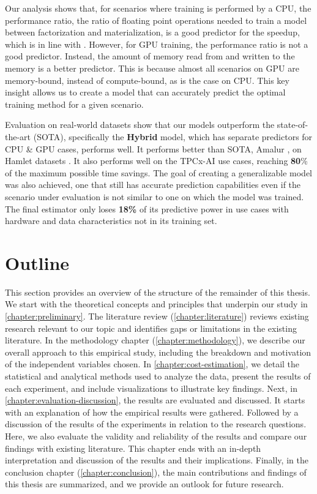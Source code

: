 Our analysis shows that, for scenarios where training is performed by a CPU, the performance ratio, the ratio of floating point operations needed to train a model between factorization and materialization, is a good predictor for the speedup, which is in line with \cite{amalur}. However, for GPU training, the performance ratio is not a good predictor. Instead, the amount of memory read from and written to the memory is a better predictor. This is because almost all scenarios on GPU are memory-bound, instead of compute-bound, as is the case on CPU. This key insight allows us to create a model that can accurately predict the optimal training method for a given scenario.

Evaluation on real-world datasets show that our models outperform the state-of-the-art (SOTA), specifically the \textbf{Hybrid} model, which has separate predictors for CPU \& GPU cases, performs well. It performs better than SOTA, Amalur \cite{schijndel_cost_estimation}, on Hamlet datasets \cite{2016-hamlet-sigmod}. It also performs well on the TPCx-AI use cases, reaching \textbf{80}\% of the maximum possible time savings. The goal of creating a generalizable model was also achieved, one that still has accurate prediction capabilities even if the scenario under evaluation is not similar to one on which the model was trained. The final estimator only loses \textbf{18\%} of its predictive power in use cases with hardware and data characteristics not in its training set.

\section{Outline}
This section provides an overview of the structure of the remainder of this thesis. We start with the theoretical concepts and principles that underpin our study in \autoref{chapter:preliminary}. The literature review (\autoref{chapter:literature}) reviews existing research relevant to our topic and identifies gaps or limitations in the existing literature. In the methodology chapter (\autoref{chapter:methodology}), we describe our overall approach to this empirical study, including the breakdown and motivation of the independent variables chosen.  In \autoref{chapter:cost-estimation}, we detail the statistical and analytical methods used to analyze the data, present the results of each experiment, and include visualizations to illustrate key findings. Next, in \autoref{chapter:evaluation-discussion}, the results are evaluated and discussed. It starts with an explanation of how the empirical results were gathered. Followed by a discussion of the results of the experiments in relation to the research questions. Here, we also evaluate the validity and reliability of the results and compare our findings with existing literature. This chapter ends with an in-depth interpretation and discussion of the results and their implications.  Finally, in the conclusion chapter (\autoref{chapter:conclusion}), the main contributions and findings of this thesis are summarized, and we provide an outlook for future research.

